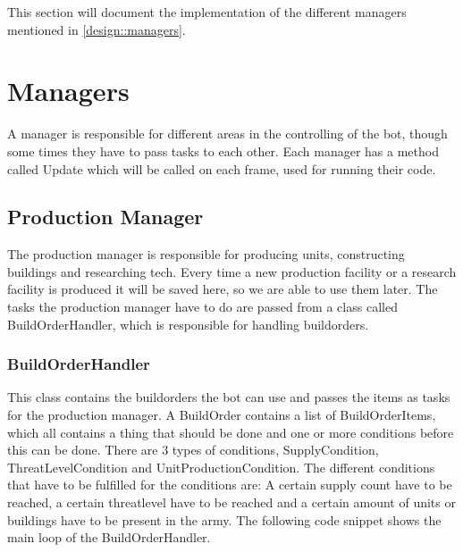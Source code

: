 This section will document the implementation of the different managers mentioned in \ref{design::managers}. 

\section{Managers}
	A manager is responsible for different areas in the controlling of the bot, though some times they have to pass tasks to each other. Each manager has 
	a method called Update which will be called on each frame, used for running their code.
	\subsection{Production Manager}
		The production manager is responsible for producing units, constructing buildings and researching tech. Every time a new production facility or 
		a research facility is produced it will be saved here, so we are able to use them later. The tasks the production manager have to do are passed from a 
		class called BuildOrderHandler, which is responsible for handling buildorders.
		\subsubsection*{BuildOrderHandler}
			This class contains the buildorders the bot can use and passes the items as tasks for the production manager. A BuildOrder contains a list of 
			BuildOrderItems, which all contains a thing that should be done and one or more conditions before this can be done. 
			There are 3 types of conditions, SupplyCondition, ThreatLevelCondition and UnitProductionCondition. The different conditions that have 
			to be fulfilled for the conditions are: A certain supply count have to be reached, a certain threatlevel have to be reached and a certain 
			amount of units or buildings have to be present in the army. The following code snippet shows the main loop of the BuildOrderHandler. 
			
